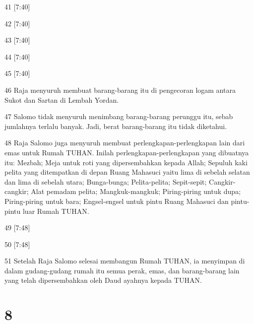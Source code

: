 \par 41 [7:40]
\par 42 [7:40]
\par 43 [7:40]
\par 44 [7:40]
\par 45 [7:40]
\par 46 Raja menyuruh membuat barang-barang itu di pengecoran logam antara Sukot dan Sartan di Lembah Yordan.
\par 47 Salomo tidak menyuruh menimbang barang-barang perunggu itu, sebab jumlahnya terlalu banyak. Jadi, berat barang-barang itu tidak diketahui.
\par 48 Raja Salomo juga menyuruh membuat perlengkapan-perlengkapan lain dari emas untuk Rumah TUHAN. Inilah perlengkapan-perlengkapan yang dibuatnya itu: Mezbah; Meja untuk roti yang dipersembahkan kepada Allah; Sepuluh kaki pelita yang ditempatkan di depan Ruang Mahasuci yaitu lima di sebelah selatan dan lima di sebelah utara; Bunga-bunga; Pelita-pelita; Sepit-sepit; Cangkir-cangkir; Alat pemadam pelita; Mangkuk-mangkuk; Piring-piring untuk dupa; Piring-piring untuk bara; Engsel-engsel untuk pintu Ruang Mahasuci dan pintu-pintu luar Rumah TUHAN.
\par 49 [7:48]
\par 50 [7:48]
\par 51 Setelah Raja Salomo selesai membangun Rumah TUHAN, ia menyimpan di dalam gudang-gudang rumah itu semua perak, emas, dan barang-barang lain yang telah dipersembahkan oleh Daud ayahnya kepada TUHAN.

\chapter{8}

